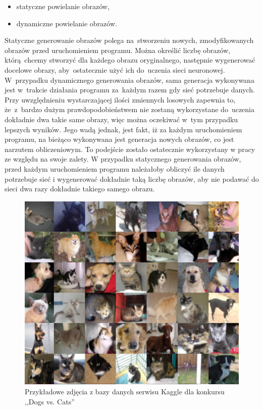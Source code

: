 \begin{itemize}
\item statyczne powielanie obrazów,
\item dynamiczne powielanie obrazów.
\end{itemize}
Statyczne generowanie obrazów polega na~stworzeniu nowych, zmodyfikowanych obrazów przed uruchomieniem programu. Można określić liczbę obrazów, którą~chcemy stworzyć dla każdego obrazu oryginalnego, następnie wygenerować docelowe obrazy, aby~ostatecznie użyć ich do~uczenia sieci neuronowej. W~przypadku dynamicznego generowania obrazów, sama generacja wykonywana jest w~trakcie działania programu za~każdym razem gdy sieć potrzebuje danych. Przy uwzględnieniu wystarczającej ilości zmiennych losowych zapewnia to, że~z~bardzo dużym prawdopodobieństwem nie zostaną wykorzystane do~uczenia dokładnie dwa takie same obrazy, więc można oczekiwać w~tym przypadku lepszych wyników. Jego wadą jednak, jest fakt, iż za każdym uruchomieniem programu, na bieżąco wykonywana jest generacja nowych obrazów, co jest narzutem obliczeniowym. To podejście zostało ostatecznie wykorzystany w pracy ze względu na swoje zalety. W przypadku statycznego generowania obrazów, przed każdym uruchomieniem programu należałoby obliczyć ile danych potrzebuje sieć i wygenerować dokładnie taką liczbę obrazów, aby nie podawać do sieci dwa razy dokładnie takiego samego obrazu.

\begin{figure}[ht!]
\centering
\includegraphics[scale=0.8]{res/catsdogs.png}
\caption[Caption for LOF]{Przykładowe zdjęcia z bazy danych serwisu Kaggle dla konkursu ,,Dogs vs. Cats'' \label{catsdogs}}
\end{figure} 

